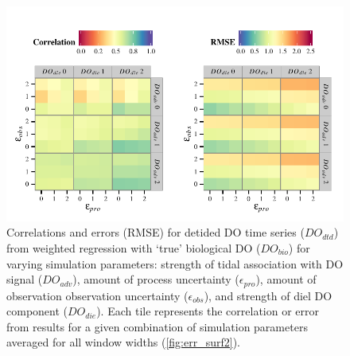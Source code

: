 \documentclass[letterpaper,12pt,oneside]{article}\usepackage[]{graphicx}\usepackage[]{color}
\makeatletter
\def\maxwidth{ %
  \ifdim\Gin@nat@width>\linewidth
    \linewidth
  \else
    \Gin@nat@width
  \fi
}
\newenvironment{knitrout}{}{} %
\makeatother
\begin{document}
\centering\vspace*{\fill}
\begin{knitrout}
\color{fgcolor}\begin{figure}[!ht]


{\centering \includegraphics[width=\maxwidth]{figure/err_surf1} 

}

\caption[Correlations and errors (\ac{RMSE}) for detided \ac{DO} time series ($DO_{dtd}$) from weighted regression with `true' biological \ac{DO} ($DO_{bio}$) for varying simulation parameters]{Correlations and errors (\ac{RMSE}) for detided \ac{DO} time series ($DO_{dtd}$) from weighted regression with `true' biological \ac{DO} ($DO_{bio}$) for varying simulation parameters: strength of tidal association with \ac{DO} signal ($DO_{adv}$), amount of process uncertainty ($\epsilon_{pro}$), amount of observation observation uncertainty ($\epsilon_{obs}$), and strength of diel \ac{DO} component ($DO_{die}$).  Each tile represents the correlation or error from results for a given combination of simulation parameters averaged for all window widths (\cref{fig:err_surf2}).\label{fig:err_surf1}}
\end{figure}


\end{knitrout}
\vfill
\clearpage
\end{document}
